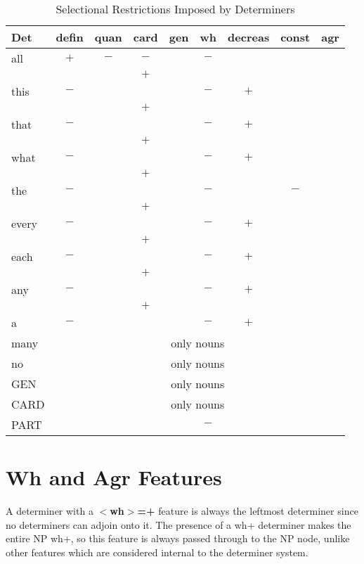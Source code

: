 \begin{table}[hbt]
\vspace*{-2mm}
\centering
\begin{tabular}{|l||c|c|c|c|c|c|c|c|}
\hline
Det&defin&quan&card&gen&wh&decreas&const&agr\\
\hline
\hline
all&$+$&$-$&$-$&&$-$&&&\\
&&&$+$&&&&&\\ \hline
this&$-$&&&&$-$&$+$&&\\
&&&$+$&&&&&\\ \hline
that&$-$&&&&$-$&$+$&&\\
&&&$+$&&&&&\\ \hline
what&$-$&&&&$-$&$+$&&\\
&&&$+$&&&&&\\ \hline
the&$-$&&&&$-$&&$-$&\\ 
&&&$+$&&&&&\\ \hline
every&$-$&&&&$-$&$+$&&\\
&&&$+$&&&&&\\ \hline
each&$-$&&&&$-$&$+$&&\\
&&&$+$&&&&&\\ \hline
any&$-$&&&&$-$&$+$&&\\ 
&&&$+$&&&&&\\ \hline
a&$-$&&&&$-$&$+$&&\\ \hline
many&\multicolumn{8}{c|}{only nouns}\\ \hline
no&\multicolumn{8}{c|}{only nouns}\\ \hline
GEN&\multicolumn{8}{c|}{only nouns}\\ \hline
CARD&\multicolumn{8}{c|}{only nouns}\\ \hline
PART&&&&&$-$&&&\\ \hline
\end{tabular}
\caption{Selectional Restrictions Imposed by Determiners}
\label{det-ordering}
\end{table}



\section{Wh and Agr Features}
\label{agr-section}
A determiner with a {\bf $<$wh$>$=+} feature is always the leftmost
determiner since no determiners can adjoin onto it.  The presence of a wh+
determiner makes the entire NP wh+, so this feature is always passed through to
the NP node, unlike other features which are considered internal to the
determiner system.

